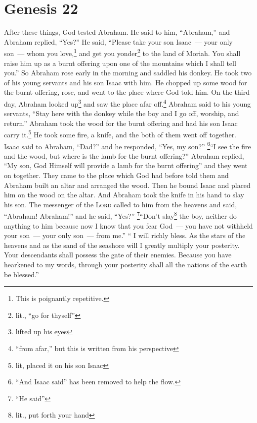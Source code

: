 \section{Genesis 22}\label{Genesis 22}
\begin{enumerate}[align=center]
     After these things, God tested Abraham. He said to him, ``Abraham,'' and Abraham replied, ``Yes?''%
     He said, ``Please take your son Isaac~--- your only son~--- whom you love,\footnote{This is poignantly repetitive.} and get you yonder\footnote{lit., ``go for thyself''} to the land of Moriah. You shall raise him up as a burnt offering upon one of the mountains which I shall tell you.''%
     So Abraham rose early in the morning and saddled his donkey. He took two of his young servants and his son Isaac with him. He chopped up some wood for the burnt offering, rose, and went to the place where God told him.%
     On the third day, Abraham looked up\footnote{lifted up his eyes} and saw the place afar off.\footnote{``from afar,'' but this is written from his perspective}%
     Abraham said to his young servants, ``Stay here with the donkey while the boy and I go off, worship, and return.''%
     Abraham took the wood for the burnt offering and had his son Isaac carry it.\footnote{lit, placed it on his son Isaac} He took some fire, a knife, and the both of them went off together.%
     Isaac said to Abraham, ``Dad?'' and he responded, ``Yes, my son?'' \footnote{``And Isaac said'' has been removed to help the flow.}``I see the fire and the wood, but where is the lamb for the burnt offering?''%
     Abraham replied, ``My son, God Himself will provide a lamb for the burnt offering'' and they went on together.%
     They came to the place which God had before told them and Abraham built an altar and arranged the wood. Then he bound Isaac and placed him on the wood on the altar.%
     And Abraham took the knife in his hand to slay his son.%
     The messenger of the \textsc{Lord} called to him from the heavens and said, ``Abraham! Abraham!'' and he said, ``Yes?''%
     \footnote{``He said''}``Don't slay\footnote{lit., put forth your hand} the boy, neither do anything to him because now I know that you fear God~--- you have not withheld your son~--- your only son~--- from me.''%
     ``%
     I will richly bless. As the stars of the heavens and as the sand of the seashore will I greatly multiply your posterity. Your descendants shall possess the gate of their enemies.%
     Because you have hearkened to my words, through your posterity shall all the nations of the earth be blessed.''%
\end{enumerate}
